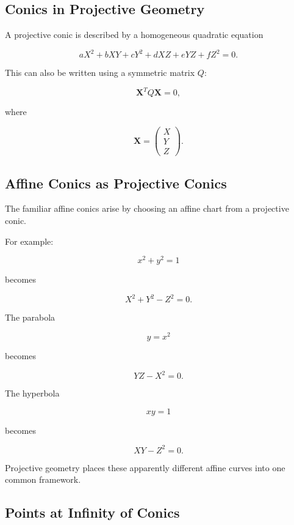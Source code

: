\subsection{Conics in Projective Geometry}
\label{subsec:projective-conics}

A projective conic is described by a homogeneous quadratic equation

\[
\boxed{
aX^2+bXY+cY^2+dXZ+eYZ+fZ^2=0.
}
\]

This can also be written using a symmetric matrix \(Q\):

\[
\boxed{
\mathbf{X}^{T}Q\mathbf{X}=0,
}
\]

where

\[
\mathbf{X}
=
\begin{pmatrix}
X\\Y\\Z
\end{pmatrix}.
\]

\subsection{Affine Conics as Projective Conics}
\label{subsec:affine-conics-projective}

The familiar affine conics arise by choosing an affine chart from a
projective conic.

For example:

\[
x^2+y^2=1
\]

becomes

\[
X^2+Y^2-Z^2=0.
\]

The parabola

\[
y=x^2
\]

becomes

\[
YZ-X^2=0.
\]

The hyperbola

\[
xy=1
\]

becomes

\[
XY-Z^2=0.
\]

Projective geometry places these apparently different affine curves into one
common framework.

\subsection{Points at Infinity of Conics}
\label{subsec:conics-points-at-infinity}

